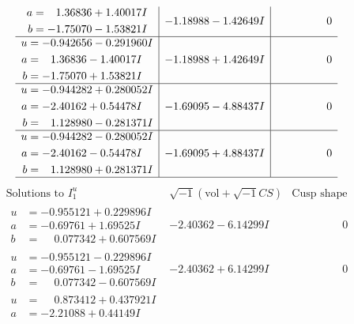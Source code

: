 \documentclass[1p]{elsarticle_modified}
\theoremstyle{definition}
\newcommand{\I}{\sqrt{-1}}
\begin{document}
$$\begin{array}{c|c|c}
\begin{aligned}
a &= \phantom{-}1.36836 + 1.40017 I \\
b &= -1.75070 - 1.53821 I\end{aligned}
 & -1.18988 - 1.42649 I & \phantom{-0.000000 } 0 \\ \hline\begin{aligned}
u &= -0.942656 - 0.291960 I \\
a &= \phantom{-}1.36836 - 1.40017 I \\
b &= -1.75070 + 1.53821 I\end{aligned}
 & -1.18988 + 1.42649 I & \phantom{-0.000000 } 0 \\ \hline\begin{aligned}
u &= -0.944282 + 0.280052 I \\
a &= -2.40162 + 0.54478 I \\
b &= \phantom{-}1.128980 - 0.281371 I\end{aligned}
 & -1.69095 - 4.88437 I & \phantom{-0.000000 } 0 \\ \hline\begin{aligned}
u &= -0.944282 - 0.280052 I \\
a &= -2.40162 - 0.54478 I \\
b &= \phantom{-}1.128980 + 0.281371 I\end{aligned}
 & -1.69095 + 4.88437 I & \phantom{-0.000000 } 0\\
 \hline 
 \end{array}$$\newpage$$\begin{array}{c|c|c}  
\text{Solutions to }I^u_{1}& \I (\text{vol} + \sqrt{-1}CS) & \text{Cusp shape}\\
 \hline 
\begin{aligned}
u &= -0.955121 + 0.229896 I \\
a &= -0.69761 + 1.69525 I \\
b &= \phantom{-}0.077342 + 0.607569 I\end{aligned}
 & -2.40362 - 6.14299 I & \phantom{-0.000000 } 0 \\ \hline\begin{aligned}
u &= -0.955121 - 0.229896 I \\
a &= -0.69761 - 1.69525 I \\
b &= \phantom{-}0.077342 - 0.607569 I\end{aligned}
 & -2.40362 + 6.14299 I & \phantom{-0.000000 } 0 \\ \hline\begin{aligned}
u &= \phantom{-}0.873412 + 0.437921 I \\
a &= -2.21088 + 0.44149 I \\

\end{aligned}
\end{array}$$
\end{document}
